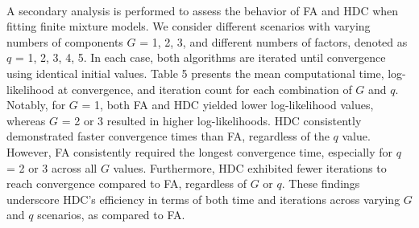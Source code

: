 \documentclass[11pt]{article}
\begin{document}
\\
A secondary analysis is performed to assess the behavior of FA and HDC when fitting finite mixture models. We consider different scenarios with varying numbers of components $G$ = 1, 2, 3, and different numbers of factors, denoted as $q$ = 1, 2, 3, 4, 5. In each case, both algorithms are iterated until convergence using identical initial values. Table 5 presents the mean computational time, log-likelihood at convergence, and iteration count for each combination of $G$ and $q$. Notably, for $G$ = 1, both FA and HDC yielded lower log-likelihood values, whereas $G$ = 2 or 3 resulted in higher log-likelihoods. HDC consistently demonstrated faster convergence times than FA, regardless of the $q$ value. However, FA consistently required the longest convergence time, especially for $q$ = 2 or 3 across all $G$ values. Furthermore, HDC exhibited fewer iterations to reach convergence compared to FA, regardless of $G$ or $q$. These findings underscore HDC's efficiency in terms of both time and iterations across varying $G$ and $q$ scenarios, as compared to FA.
\\
\end{document}
